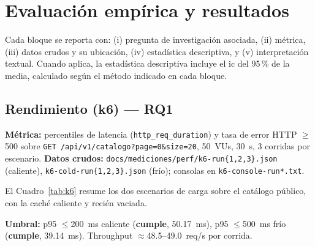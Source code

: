 
\chapter{Evaluación empírica y resultados}
\label{cap:evaluacion-resultados}

Cada bloque se reporta con: (i) pregunta de investigación asociada, (ii)
métrica, (iii) datos crudos y su ubicación, (iv) estadística descriptiva,
y (v) interpretación textual. Cuando aplica, la estadística descriptiva
incluye el \gls{ic} del 95\,\% de la media, calculado según el método
indicado en cada bloque.

\section{Rendimiento (k6) --- RQ1}

\textbf{Métrica:} percentiles de latencia (\texttt{http\_req\_duration}) y
tasa de error HTTP $\geq$500 sobre
\texttt{GET /api/v1/catalogo?page=0\&size=20}, 50~VUs, 30~s, 3 corridas
por escenario. \textbf{Datos crudos:}
\texttt{docs/mediciones/perf/k6-run\{1,2,3\}.json} (caliente),
\texttt{k6-cold-run\{1,2,3\}.json} (frío); consolas en
\texttt{k6-console-run*.txt}.

El Cuadro~\ref{tab:k6} resume los dos escenarios de carga sobre el
catálogo público, con la caché caliente y recién vaciada.

\begin{table}[H]
\centering
\caption{Resultados de la prueba de carga k6 por escenario}
\label{tab:k6}
\end{table}

\textbf{Umbral:} p95 $\leq$200~ms caliente (\textbf{cumple}, 50.17~ms),
p95 $\leq$500~ms frío (\textbf{cumple}, 39.14~ms). Throughput
$\approx$48.5--49.0~req/s por corrida.

